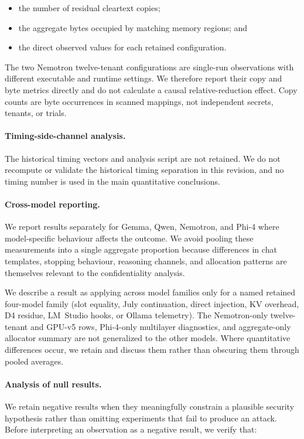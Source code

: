 \begin{itemize}
    \item the number of residual cleartext copies;
    \item the aggregate bytes occupied by matching memory regions; and
    \item the direct observed values for each retained configuration.
\end{itemize}

The two Nemotron twelve-tenant configurations are single-run observations with
different executable and runtime settings. We therefore report their copy
and byte metrics directly and do not calculate a causal relative-reduction
effect. Copy counts are byte occurrences in scanned mappings, not
independent secrets, tenants, or trials.

\paragraph{Timing-side-channel analysis.}
The historical timing vectors and analysis script are not retained. We do
not recompute or validate the historical timing separation in this revision,
and no timing number is used in the main quantitative conclusions.

\paragraph{Cross-model reporting.}
We report results separately for Gemma, Qwen, Nemotron, and Phi-4 where
model-specific behaviour affects the outcome. We avoid pooling these
measurements into a single aggregate proportion because differences in
chat templates, stopping behaviour, reasoning channels, and allocation
patterns are themselves relevant to the confidentiality analysis.

We describe a result as applying across model families only for a named
retained four-model family (slot equality, July continuation, direct
injection, KV overhead, D4 residue, LM~Studio hooks, or Ollama telemetry).
The Nemotron-only twelve-tenant and GPU-v5 rows, Phi-4-only multilayer
diagnostics, and aggregate-only allocator summary are not generalized to
the other models. Where quantitative differences occur, we retain and
discuss them rather than obscuring them through pooled averages.

\paragraph{Analysis of null results.}
We retain negative results when they meaningfully constrain a plausible
security hypothesis rather than omitting experiments that fail to
produce an attack. Before interpreting an observation as a negative
result, we verify that:

